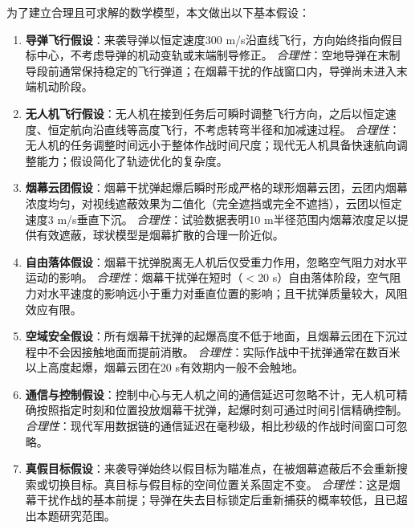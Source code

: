 
为了建立合理且可求解的数学模型，本文做出以下基本假设：

\begin{enumerate}[label=\textbf{假设\arabic*：}, leftmargin=*]
    \item \textbf{导弹飞行假设}：来袭导弹以恒定速度300 m/s沿直线飞行，方向始终指向假目标中心，不考虑导弹的机动变轨或末端制导修正。
    \textit{合理性}：空地导弹在末制导段前通常保持稳定的飞行弹道；在烟幕干扰的作战窗口内，导弹尚未进入末端机动阶段。

    \item \textbf{无人机飞行假设}：无人机在接到任务后可瞬时调整飞行方向，之后以恒定速度、恒定航向沿直线等高度飞行，不考虑转弯半径和加减速过程。
    \textit{合理性}：无人机的任务调整时间远小于整体作战时间尺度；现代无人机具备快速航向调整能力；假设简化了轨迹优化的复杂度。

    \item \textbf{烟幕云团假设}：烟幕干扰弹起爆后瞬时形成严格的球形烟幕云团，云团内烟幕浓度均匀，对视线遮蔽效果为二值化（完全遮挡或完全不遮挡），云团以恒定速度3 m/s垂直下沉。
    \textit{合理性}：试验数据表明10 m半径范围内烟幕浓度足以提供有效遮蔽，球状模型是烟幕扩散的合理一阶近似\cite{zhang2020}。

    \item \textbf{自由落体假设}：烟幕干扰弹脱离无人机后仅受重力作用，忽略空气阻力对水平运动的影响。
    \textit{合理性}：烟幕干扰弹在短时（$<$20 s）自由落体阶段，空气阻力对水平速度的影响远小于重力对垂直位置的影响；且干扰弹质量较大，风阻效应有限。

    \item \textbf{空域安全假设}：所有烟幕干扰弹的起爆高度不低于地面，且烟幕云团在下沉过程中不会因接触地面而提前消散。
    \textit{合理性}：实际作战中干扰弹通常在数百米以上高度起爆，烟幕云团在20 s有效期内一般不会触地。

    \item \textbf{通信与控制假设}：控制中心与无人机之间的通信延迟可忽略不计，无人机可精确按照指定时刻和位置投放烟幕干扰弹，起爆时刻可通过时间引信精确控制。
    \textit{合理性}：现代军用数据链的通信延迟在毫秒级，相比秒级的作战时间窗口可忽略。

    \item \textbf{真假目标假设}：来袭导弹始终以假目标为瞄准点，在被烟幕遮蔽后不会重新搜索或切换目标。真目标与假目标的空间位置关系固定不变。
    \textit{合理性}：这是烟幕干扰作战的基本前提；导弹在失去目标锁定后重新捕获的概率较低，且已超出本题研究范围。
\end{enumerate}
